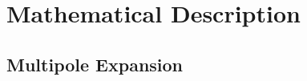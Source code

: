 \section{Mathematical Description}
\label{sec:mathematical-description}
\subsection{Multipole Expansion}
